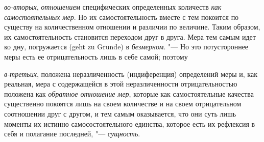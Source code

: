 {\em во-вторых}, {\em отношением}
специфических определенных количеств {\em как
самостоятельных мер}. Но их самостоятельность вместе с тем покоится по
существу на количественном отношении и различии по величине. Таким образом,
их самостоятельность становится переходом друг в друга. Мера тем самым идет
ко дну, погружается (geht zu Grunde) в {\em безмерном}.
"--- Но это потустороннее меры есть ее отрицательность лишь в себе самой;
поэтому

{\em в-третьих}, положена неразличенность (индиференция)
определений меры и, как реальная, мера с содержащейся в этой
неразличенности отрицательностью положена как
{\em обратное отношение мер}, которые как
самостоятельные качества существенно покоятся лишь на своем количестве и на
своем отрицательном соотношении друг с другом, и тем самым оказывается, что
они суть лишь моменты их истинно самосостоятельного единства, которое есть
их рефлексия в себя и полагание последней, "--- {\em сущность}.

